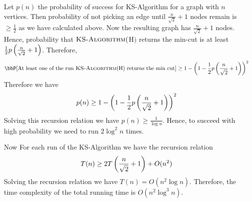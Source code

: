 Let $p(n)$ the probability of success for KS-Algorithm for a graph with $n$ vertices. Then probability of not picking an edge until $\frac{n}{\sqrt{2}}+1$ nodes remain is $\geq \frac12$ as we have calculated above. Now the resulting graph has $\frac{n}{\sqrt{2}}+1$ nodes. Hence, probability that  $\textsc{KS-Algorithm}($H$)$ returns the min-cut is at least $\frac{1}2p\left(\frac{n}{\sqrt{2}}+1\right)$. Therefore, $$\bbP[\text{At least one of the run $\textsc{KS-Algorithm}($H$)$ returns the min cut}]\geq 1-\lt(1-\frac{1}2p\lt(\frac{n}{\sqrt{2}}+1\rt)\rt)^2$$Therefore we have $$p(n)\geq 1-\left(1-\frac{1}2p\left(\frac{n}{\sqrt{2}}+1\right)\right)^2$$Solving this recursion relation we have $p(n)\geq \frac1{\log n}$. Hence, to succeed with high probability we need to run $2\log ^2n$ times. 

Now For each run of the KS-Algorithm we have the recursion relation $$T(n)\geq 2T\left(\frac{n}{\sqrt{2}}+1\right)+O(n^2)$$Solving the recursion relation we have $T(n)=O(n^2\log n)$. Therefore, the time complexity of the total running time is $O(n^2\log ^3n)$.